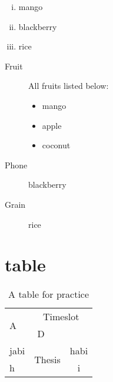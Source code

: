 \documentclass{article}
\begin{document}
\begin{enumerate}[(i)]
	\item mango
	\item blackberry
	\item rice
\end{enumerate}

\begin{description}
	\item[Fruit] All fruits listed below:
	\begin{itemize}
		\item mango
		\item apple
		\item coconut
	\end{itemize}
	\item[Phone] blackberry
	\item[Grain] rice
\end{description}


\section{table}

\begin{table}[h] %
\centering
\begin{tabular}{|l|c|r|c|}
\hline
\multirow{2}{*}{A} & \multicolumn{3}{c|}{Timeslot} \\
\cline{2-4}
 & D & & \\
\hline
 jabi & \multicolumn{2}{c}{\multirow{2}{*}{Thesis}} & habi \\
\cline{4-4}
h & \multicolumn{2}{c}{} & i \\
\end{tabular}
\caption{A table for practice}
\label{table}
\end{table}
\end{document}
